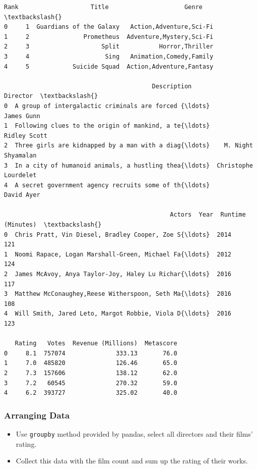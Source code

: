 \documentclass[11pt]{article}
\providecommand{\tightlist}{%
      \setlength{\itemsep}{0pt}\setlength{\parskip}{0pt}}
\begin{document}
    \begin{Verbatim}[commandchars=\\\{\}]
   Rank                    Title                     Genre  \textbackslash{}
0     1  Guardians of the Galaxy   Action,Adventure,Sci-Fi   
1     2               Prometheus  Adventure,Mystery,Sci-Fi   
2     3                    Split           Horror,Thriller   
3     4                     Sing   Animation,Comedy,Family   
4     5            Suicide Squad  Action,Adventure,Fantasy   

                                         Description              Director  \textbackslash{}
0  A group of intergalactic criminals are forced {\ldots}            James Gunn   
1  Following clues to the origin of mankind, a te{\ldots}          Ridley Scott   
2  Three girls are kidnapped by a man with a diag{\ldots}    M. Night Shyamalan   
3  In a city of humanoid animals, a hustling thea{\ldots}  Christophe Lourdelet   
4  A secret government agency recruits some of th{\ldots}            David Ayer   

                                              Actors  Year  Runtime (Minutes)  \textbackslash{}
0  Chris Pratt, Vin Diesel, Bradley Cooper, Zoe S{\ldots}  2014                121   
1  Noomi Rapace, Logan Marshall-Green, Michael Fa{\ldots}  2012                124   
2  James McAvoy, Anya Taylor-Joy, Haley Lu Richar{\ldots}  2016                117   
3  Matthew McConaughey,Reese Witherspoon, Seth Ma{\ldots}  2016                108   
4  Will Smith, Jared Leto, Margot Robbie, Viola D{\ldots}  2016                123   

   Rating   Votes  Revenue (Millions)  Metascore  
0     8.1  757074              333.13       76.0  
1     7.0  485820              126.46       65.0  
2     7.3  157606              138.12       62.0  
3     7.2   60545              270.32       59.0  
4     6.2  393727              325.02       40.0  

    \end{Verbatim}

    \subsubsection{Arranging Data}\label{arranging-data}

\begin{itemize}
\tightlist
\item
  Use \texttt{groupby} method provided by pandas, select all directors
  and their films' rating.
\item
  Collect this data with the film count and sum up the rating of their
  works.
\end{itemize}
\end{document}
